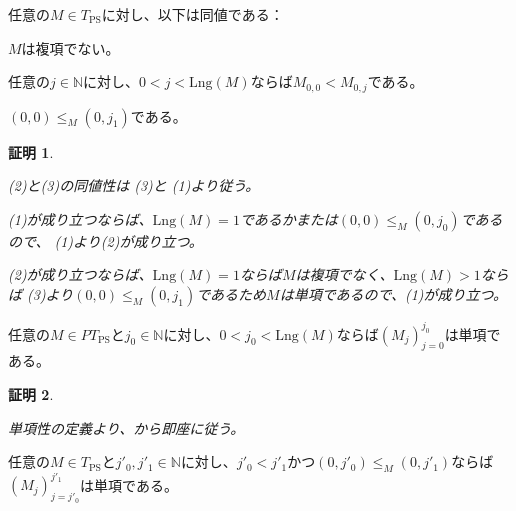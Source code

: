 \documentclass[dvipdfmx,uplatex]{jsarticle}
\theoremstyle{customnonumberbreakfortheorem}
\theoremstyle{customnonumberbreakforproof}
\newtheorem{hideableproof}{証明}
\begin{document}
\begin{proposition}[複項性の判定条件]\label{複項性の判定条件}
	任意の\(M \in T_{\textrm{PS}}\)に対し、以下は同値である：
	\begin{penumerate}
		\item \(M\)は複項でない。
		\item 任意の\(j \in \mathbb{N}\)に対し、\(0 < j < \textrm{Lng}(M)\)ならば\(M_{0,0} < M_{0,j}\)である。
		\item \((0,0) \leq_M (0,j_1)\)である。
	\end{penumerate}
\end{proposition}

\begin{hideableproof}
	\begin{indented}
		\item (2)と(3)の同値性は (3)と (1)より従う。
		\item (1)が成り立つならば、\(\textrm{Lng}(M) = 1\)であるかまたは\((0,0) \leq_M (0,j_0)\)であるので、 (1)より(2)が成り立つ。
		\item (2)が成り立つならば、\(\textrm{Lng}(M) = 1\)ならば\(M\)は複項でなく、\(\textrm{Lng}(M) > 1\)ならば (3)より\((0,0) \leq_M (0,j_1)\)であるため\(M\)は単項であるので、(1)が成り立つ。
	\end{indented}
\end{hideableproof}

\begin{corollary}[単項性の始切片への遺伝性]\label{単項性の始切片への遺伝性}
	任意の\(M \in PT_{\textrm{PS}}\)と\(j_0 \in \mathbb{N}\)に対し、\(0 < j_0 < \textrm{Lng}(M)\)ならば\((M_j)_{j=0}^{j_0}\)は単項である。
\end{corollary}

\begin{hideableproof}
	\begin{indented}
		\item 単項性の定義より、から即座に従う。
	\end{indented}
\end{hideableproof}

\begin{proposition}[単項性の直系先祖による切片への遺伝性]\label{単項性の直系先祖による切片への遺伝性}
	任意の\(M \in T_{\textrm{PS}}\)と\(j'_0,j'_1 \in \mathbb{N}\)に対し、\(j'_0 < j'_1\)かつ\((0,j'_0) \leq_M (0,j'_1)\)ならば\((M_j)_{j=j'_0}^{j'_1}\)は単項である。
\end{proposition}
\end{document}
